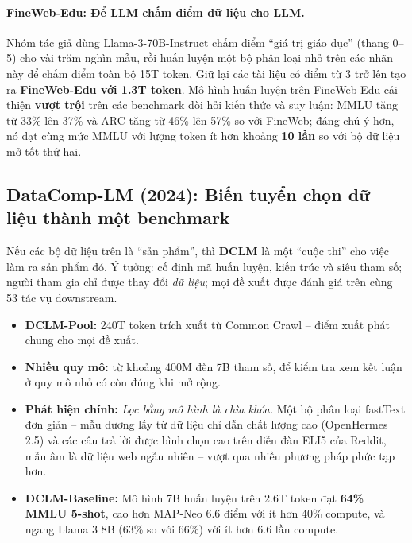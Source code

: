 \paragraph{FineWeb-Edu: Để LLM chấm điểm dữ liệu cho LLM.}
Nhóm tác giả dùng Llama-3-70B-Instruct chấm điểm “giá trị giáo dục” (thang 0--5) cho vài trăm nghìn mẫu, rồi huấn luyện một bộ phân loại nhỏ trên các nhãn này để chấm điểm toàn bộ 15T token. Giữ lại các tài liệu có điểm từ 3 trở lên tạo ra \textbf{FineWeb-Edu với 1.3T token}. Mô hình huấn luyện trên FineWeb-Edu cải thiện \textbf{vượt trội} trên các benchmark đòi hỏi kiến thức và suy luận: MMLU tăng từ 33\% lên 37\% và ARC tăng từ 46\% lên 57\% so với FineWeb; đáng chú ý hơn, nó đạt cùng mức MMLU với lượng token ít hơn khoảng \textbf{10 lần} so với bộ dữ liệu mở tốt thứ hai.

\begin{center}
\label{fig:fineweb_edu}
\end{center}

\subsection{DataComp-LM (2024): Biến tuyển chọn dữ liệu thành một benchmark}
\label{ssec:dclm}
Nếu các bộ dữ liệu trên là “sản phẩm”, thì \textbf{DCLM} \cite{li2024dclm} là một “cuộc thi” cho việc làm ra sản phẩm đó. Ý tưởng: cố định mã huấn luyện, kiến trúc và siêu tham số; người tham gia chỉ được thay đổi \emph{dữ liệu}; mọi đề xuất được đánh giá trên cùng 53 tác vụ downstream.
\begin{itemize}
	\item \textbf{DCLM-Pool:} 240T token trích xuất từ Common Crawl -- điểm xuất phát chung cho mọi đề xuất.
	\item \textbf{Nhiều quy mô:} từ khoảng 400M đến 7B tham số, để kiểm tra xem kết luận ở quy mô nhỏ có còn đúng khi mở rộng.
	\item \textbf{Phát hiện chính:} \emph{Lọc bằng mô hình là chìa khóa.} Một bộ phân loại fastText đơn giản -- mẫu dương lấy từ dữ liệu chỉ dẫn chất lượng cao (OpenHermes 2.5) và các câu trả lời được bình chọn cao trên diễn đàn ELI5 của Reddit, mẫu âm là dữ liệu web ngẫu nhiên -- vượt qua nhiều phương pháp phức tạp hơn.
	\item \textbf{DCLM-Baseline:} Mô hình 7B huấn luyện trên 2.6T token đạt \textbf{64\% MMLU 5-shot}, cao hơn MAP-Neo 6.6 điểm với ít hơn 40\% compute, và ngang Llama 3 8B (63\% so với 66\%) với ít hơn 6.6 lần compute.
\end{itemize}

